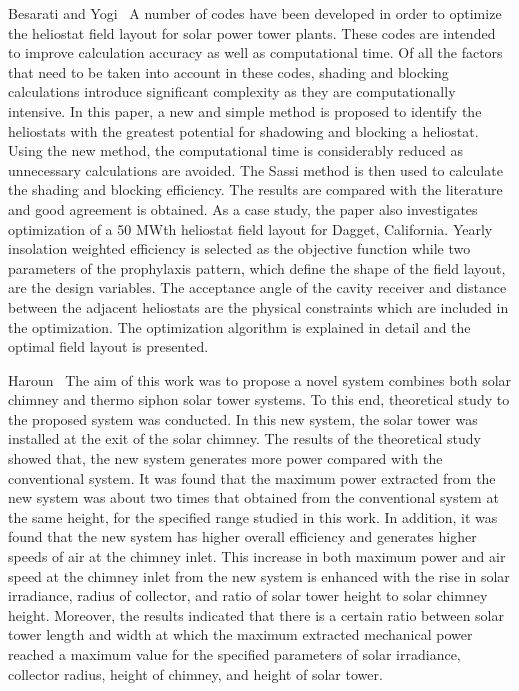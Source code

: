 Besarati and Yogi~\cite{Besarati2014} A number of codes have been developed in order to optimize the heliostat field layout for solar power tower plants. These codes are intended to improve calculation accuracy as well as computational time. Of all the factors that need to be taken into account in these codes, shading and blocking calculations introduce significant complexity as they are computationally intensive. In this paper, a new and simple method is proposed to identify the heliostats with the greatest potential for shadowing and blocking a heliostat. Using the new method, the computational time is considerably reduced as unnecessary calculations are avoided. The Sassi method is then used to calculate the shading and blocking efficiency. The results are compared with the literature and good agreement is obtained. As a case study, the paper also investigates optimization of a 50 MWth heliostat field layout for Dagget, California. Yearly insolation weighted efficiency is selected as the objective function while two parameters of the prophylaxis pattern, which define the shape of the field layout, are the design variables. The acceptance angle of the cavity receiver and distance between the adjacent heliostats are the physical constraints which are included in the optimization. The optimization algorithm is explained in detail and the optimal field layout is presented.

Haroun~\cite{El2015} The aim of this work was to propose a novel system combines both solar chimney and thermo siphon solar tower systems. To this end, theoretical study to the proposed system was conducted. In this new system, the solar tower was installed at the exit of the solar chimney. The results of the theoretical study showed that, the new system generates more power compared with the conventional system. It was found that the maximum power extracted from the new system was about two times that obtained from the conventional system at the same height, for the specified range studied in this work. In addition, it was found that the new system has higher overall efficiency and generates higher speeds of air at the chimney inlet. This increase in both maximum power and air speed at the chimney inlet from the new system is enhanced with the rise in solar irradiance, radius of collector, and ratio of solar tower height to solar chimney height. Moreover, the results indicated that there is a certain ratio between solar tower length and width at which the maximum extracted mechanical power reached a maximum value for the specified parameters of solar irradiance, collector radius, height of chimney, and height of solar tower.

